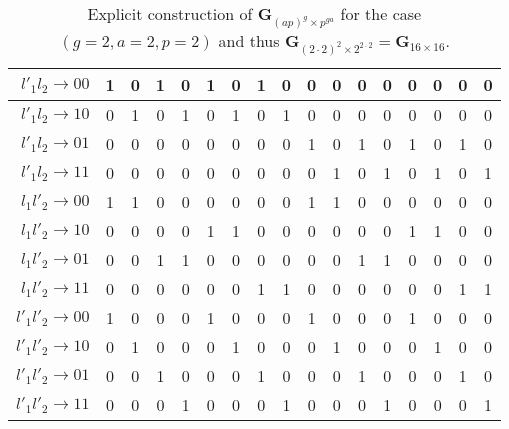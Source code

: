 \begin{table}[!ht]
\begin{tabular}{ r || c | c | c | c | c | c | c | c | c | c | c | c | c | c | c | c }
    $l'_1 l_2 \rightarrow 00$ & 1 & 0 & 1 & 0 & 1 & 0 & 1 & 0 & 0 & 0 & 0 & 0 & 0 & 0 & 0 & 0\\ \hline
    $l'_1 l_2 \rightarrow 10$ & 0 & 1 & 0 & 1 & 0 & 1 & 0 & 1 & 0 & 0 & 0 & 0 & 0 & 0 & 0 & 0\\ \hline
    $l'_1 l_2 \rightarrow 01$ & 0 & 0 & 0 & 0 & 0 & 0 & 0 & 0 & 1 & 0 & 1 & 0 & 1 & 0 & 1 & 0\\ \hline
    $l'_1 l_2 \rightarrow 11$ & 0 & 0 & 0 & 0 & 0 & 0 & 0 & 0 & 0 & 1 & 0 & 1 & 0 & 1 & 0 & 1\\ \hline

    $l_1 l'_2 \rightarrow 00$ & 1 & 1 & 0 & 0 & 0 & 0 & 0 & 0 & 1 & 1 & 0 & 0 & 0 & 0 & 0 & 0\\ \hline
    $l_1 l'_2 \rightarrow 10$ & 0 & 0 & 0 & 0 & 1 & 1 & 0 & 0 & 0 & 0 & 0 & 0 & 1 & 1 & 0 & 0\\ \hline
    $l_1 l'_2 \rightarrow 01$ & 0 & 0 & 1 & 1 & 0 & 0 & 0 & 0 & 0 & 0 & 1 & 1 & 0 & 0 & 0 & 0\\ \hline
    $l_1 l'_2 \rightarrow 11$ & 0 & 0 & 0 & 0 & 0 & 0 & 1 & 1 & 0 & 0 & 0 & 0 & 0 & 0 & 1 & 1\\ \hline

    $l'_1 l'_2 \rightarrow 00$ & 1 & 0 & 0 & 0 & 1 & 0 & 0 & 0 & 1 & 0 & 0 & 0 & 1 & 0 & 0 & 0\\ \hline
    $l'_1 l'_2 \rightarrow 10$ & 0 & 1 & 0 & 0 & 0 & 1 & 0 & 0 & 0 & 1 & 0 & 0 & 0 & 1 & 0 & 0\\ \hline
    $l'_1 l'_2 \rightarrow 01$ & 0 & 0 & 1 & 0 & 0 & 0 & 1 & 0 & 0 & 0 & 1 & 0 & 0 & 0 & 1 & 0\\ \hline
    $l'_1 l'_2 \rightarrow 11$ & 0 & 0 & 0 & 1 & 0 & 0 & 0 & 1 & 0 & 0 & 0 & 1 & 0 & 0 & 0 & 1\\
    \end{tabular}
\caption{Explicit construction of $\mathbf{G}_{(ap)^g \times p^{ga}}$ for the case $(g=2,a=2,p=2)$ and thus $\mathbf{G}_{(2 \cdot 2)^2 \times 2^{2 \cdot 2}} = \mathbf{G}_{16 \times 16}$.}
\label{tab:logmat222}
\end{table}
